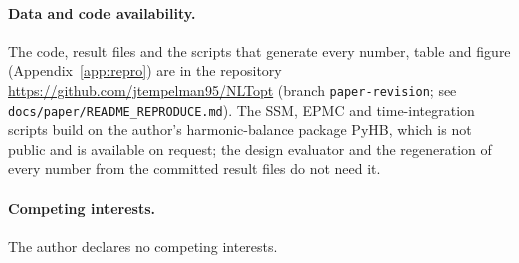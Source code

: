 \paragraph{Data and code availability.} The code, result files and the scripts that generate
every number, table and figure (Appendix~\ref{app:repro}) are in the repository
\url{https://github.com/jtempelman95/NLTopt} (branch \texttt{paper-revision}; see \texttt{docs/paper/README\_REPRODUCE.md}). The SSM, EPMC and time-integration scripts build on the author's
harmonic-balance package PyHB, which is not public and is available on request; the design
evaluator and the regeneration of every number from the committed result files do not need it.

\paragraph{Competing interests.} The author declares no competing interests.
